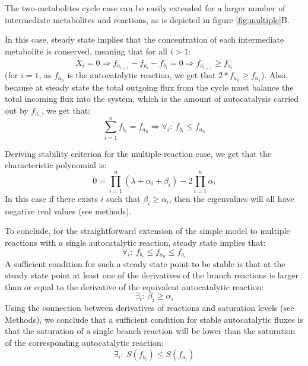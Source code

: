     The two-metabolites cycle case can be easily extended for a larger number of intermediate metabolites and reactions, as is depicted in figure \ref{fig:multiple}B.

    In this case, steady state implies that the concentration of each intermediate metabolite is conserved, meaning that for all $i>1$:
    \begin{equation*}
      \dot{X_i}=0 \Rightarrow f_{a_{i-1}}-f_{a_i}-f_{b_i}=0 \Rightarrow f_{a_{i-1}} \geq f_{a_i}
    \end{equation*}
    (for $i=1$, as $f_{a_n}$ is the autocatalytic reaction, we get that $2*f_{a_{n}} \geq f_{a_1}$).
    Also, because at steady state the total outgoing flux from the cycle must balance the total incoming flux into the system, which is the amount of autocatalysis carried out by $f_{a_n}$, we get that:
    \begin{equation*}
      \sum_{i=1}^n f_{b_i}=f_{a_n} \Rightarrow \forall_i:\ f_{b_i} \leq f_{a_n}
    \end{equation*}

    Deriving stability criterion for the multiple-reaction case, we get that the characteristic polynomial is:
    \begin{equation}
        \label{eq:complex}
        0=\prod_{i=1}^n(\lambda+\alpha_i+\beta_i)-2\prod_{i=1}^n\alpha_i
    \end{equation}
    In this case if there exists $i$ such that $\beta_i\geq\alpha_i$, then the eigenvalues will all have negative real values (see methods).
    
    To conclude, for the straightforward extension of the simple model to multiple reactions with a single autocatalytic reaction, steady state implies that:
    \begin{equation}
        \forall_i:\ f_{b_i} \leq f_{a_n} \leq f_{a_i}
      \label{eq:complexstst}
    \end{equation}
    A sufficient condition for such a steady state point to be stable is that at the steady state point at least one of the derivatives of the branch reactions is larger than or equal to the derivative of the equivalent autocatalytic reaction:
    \begin{equation}
      \exists_i:\ \beta_i \geq \alpha_i
      \label{eq:complexstab}
    \end{equation}
    Using the connection between derivatives of reactions and saturation levels (see Methods), we conclude that a sufficient condition for stable autocatalytic fluxes is that the saturation of a single branch reaction will be lower than the saturation of the corresponding autocatalytic reaction:
    \begin{equation}
        \exists_i:\ S(f_{b_i}) \leq S(f_{a_i})
      \label{eq:complexsat}
    \end{equation}


